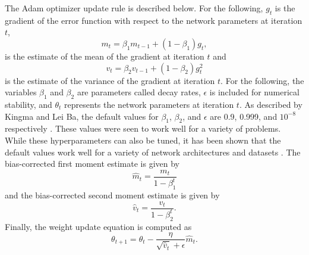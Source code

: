 The Adam optimizer update rule is described below. For the following, $g_t$ is the gradient of the error function with respect to the network parameters at iteration $t$, 
\begin{equation} \label{eq:adam1}
m_t = \beta_1 m_{t-1} + (1 - \beta_1) g_t,
\end{equation}
is the estimate of the mean of the gradient at iteration $t$ and
\begin{equation} \label{eq:adam2}
v_t = \beta_2 v_{t-1} + (1 - \beta_2) g_t^2
\end{equation}
is the estimate of the variance of the gradient at iteration $t$. For the following, the variables $\beta_1$ and $\beta_2$ are parameters called decay rates, $\epsilon$ is included for numerical stability, and $\theta_t$ represents the network parameters at iteration $t$. As described by Kingma and Lei Ba, the default values for $\beta_1$, $\beta_2$, and $\epsilon$ are 0.9, 0.999, and $10^{-8}$ respectively \cite{Kingma2015}. These values were seen to work well for a variety of problems. While these hyperparameters can also be tuned, it has been shown that the default values work well for a variety of network architectures and datasets \cite{Kingma2015}. The bias-corrected first moment estimate is given by
\begin{equation} \label{eq:adam3}
\hat{m}_t = \dfrac{m_t}{1 - \beta^t_1}
\end{equation}
and the bias-corrected second moment estimate is given by 
\begin{equation} \label{eq:adam4}
\hat{v}_t = \dfrac{v_t}{1 - \beta^t_2}.
\end{equation}
Finally, the weight update equation is computed as
\begin{equation} \label{eq:adam5}
\theta_{t+1} = \theta_{t} - \dfrac{\eta}{\sqrt{\hat{v}_t} + \epsilon} \hat{m}_t.
\end{equation}





